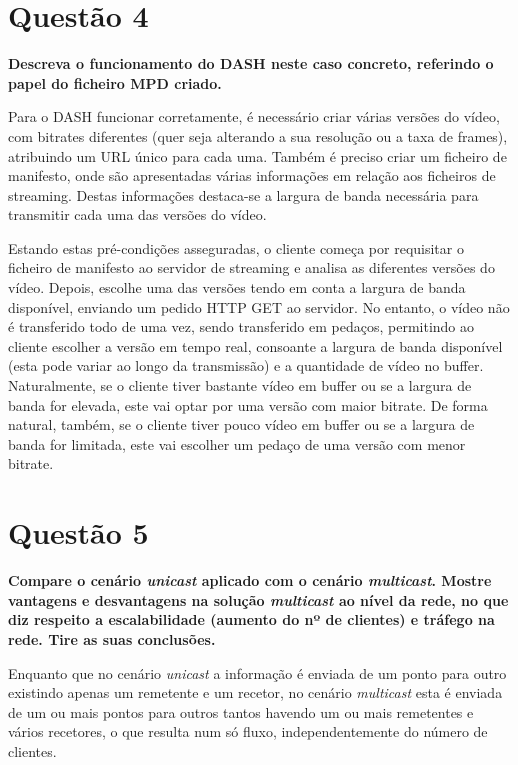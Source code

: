 \documentclass[a4paper, 11pt]{article}
\begin{document}
\section{Questão 4}
\textbf{Descreva o funcionamento do DASH neste caso concreto, referindo o papel do ficheiro MPD criado.}
\vspace{0.25cm}

Para o DASH funcionar corretamente, é necessário criar várias versões do vídeo, com bitrates diferentes (quer seja alterando a sua resolução ou a taxa de frames), atribuindo um URL único para cada uma. Também é preciso criar um ficheiro de manifesto, onde são apresentadas várias informações em relação aos ficheiros de streaming. Destas informações destaca-se a largura de banda necessária para transmitir cada uma das versões do vídeo.

Estando estas pré-condições asseguradas, o cliente começa por requisitar o ficheiro de manifesto ao servidor de streaming e analisa as diferentes versões do vídeo. Depois, escolhe uma das versões tendo em conta a largura de banda disponível, enviando um pedido HTTP GET ao servidor. No entanto, o vídeo não é transferido todo de uma vez, sendo transferido em pedaços, permitindo ao cliente escolher a versão em tempo real, consoante a largura de banda disponível (esta pode variar ao longo da transmissão) e a quantidade de vídeo no buffer. Naturalmente, se o cliente tiver bastante vídeo em buffer ou se a largura de banda for elevada, este vai optar por uma versão com maior bitrate. De forma natural, também, se o cliente tiver pouco vídeo em buffer ou se a largura de banda for limitada, este vai escolher um pedaço de uma versão com menor bitrate. \cite{livro}


\section{Questão 5}
\textbf{Compare o cenário \textit{unicast} aplicado com o cenário \textit{multicast}. Mostre vantagens e desvantagens na solução \textit{multicast} ao nível da rede, no que diz respeito a escalabilidade (aumento do nº de clientes) e tráfego na rede. Tire as suas conclusões.}
\vspace{0.25cm}

Enquanto que no cenário \textit{unicast} a informação é enviada de um ponto para outro existindo apenas um remetente e um recetor, no cenário \textit{multicast} esta é enviada de um ou mais pontos para outros tantos havendo um ou mais remetentes e vários recetores, o que resulta num só fluxo, independentemente do número de clientes. \cite{q5}
\end{document}

